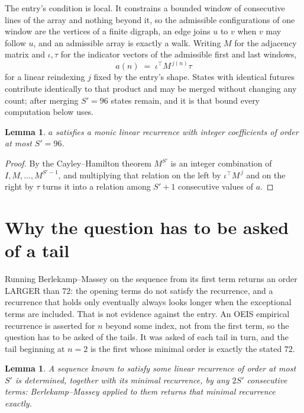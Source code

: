 \documentclass[11pt,a4paper]{article}
\theoremstyle{plain}
\newtheorem{lemma}[theorem]{Lemma}
\theoremstyle{definition}
\begin{document}
The entry's condition is local. It constrains a bounded window of consecutive lines of the
array and nothing beyond it, so the admissible configurations of one window are the vertices of
a finite digraph, an edge joins $u$ to $v$ when $v$ may follow $u$, and an admissible array is
exactly a walk. Writing $M$ for the adjacency matrix and $\iota,\tau$ for the indicator vectors
of the admissible first and last windows,
\[
a(n)\;=\;\iota^{\!\top}M^{\,j(n)}\tau
\]
for a linear reindexing $j$ fixed by the entry's shape. States with identical futures
contribute identically to that product and may be merged without changing any count; after
merging $S'=96$ states remain, and it is that bound every computation below uses.

\begin{lemma}\label{lem:cf}
$a$ satisfies a monic linear recurrence with integer coefficients of order at most $S'=96$.
\end{lemma}

\begin{proof}
By the Cayley--Hamilton theorem $M^{S'}$ is an integer combination of $I,M,\dots,M^{S'-1}$,
and multiplying that relation on the left by $\iota^{\!\top}M^{\,j}$ and on the right by
$\tau$ turns it into a relation among $S'+1$ consecutive values of $a$.
\end{proof}

\section{Why the question has to be asked of a tail}

Running Berlekamp--Massey on the sequence from its first term returns an order LARGER than $72$: the opening terms do not satisfy the recurrence, and a recurrence that holds only eventually always looks longer when the exceptional terms are included. That is not evidence against the entry. An OEIS empirical recurrence is asserted for $n$ beyond some index, not from the first term, so the question has to be asked of the tails. It was asked of each tail in turn, and the tail beginning at $n=2$ is the first whose minimal order is exactly the stated $72$.

\begin{lemma}\label{lem:bm}
A sequence known to satisfy some linear recurrence of order at most $S'$ is determined,
together with its minimal recurrence, by any $2S'$ consecutive terms: Berlekamp--Massey applied
to them returns that minimal recurrence exactly.
\end{lemma}
\end{document}
